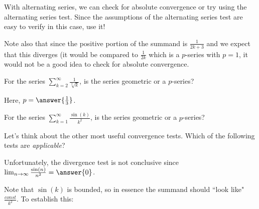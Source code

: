 \documentclass{ximera}
\begin{document}
\begin{exercise}
\begin{hint}
\begin{question}
With alternating series, we can check for absolute convergence or try using the alternating series test.  Since the assumptions of the alternating series test are easy to verify in this case, use it!

Note also that since the positive portion of the summand is $\frac{1}{2k+3}$ and we expect that this diverges (it would be compared to $\frac{1}{2k}$ which is a $p$-series with $p=1$, it would not be a good idea to check for absolute convergence.

\end{question}

\begin{question}
For the series $\sum_{k=2}^{\infty} \frac{1}{\sqrt[3]{k}}$, is the series geometric or a $p$-series?

\begin{multipleChoice}
\end{multipleChoice}

Here, $p= \answer{\frac{1}{3}}$. 
\end{question}

\begin{question}

For the series $\sum_{k=1}^{\infty} \frac{\sin(k)}{k^2}$, is the series geometric or a $p$-series?

\begin{multipleChoice}
\end{multipleChoice}

Let's think about the other most useful convergence tests.  Which of the following tests are \emph{applicable}?

\begin{selectAll}
\end{selectAll}

Unfortunately, the divergence test is not conclusive since $\lim_{n \to \infty} \frac{\sin(n)}{n^2} = \answer{0}$.  

Note that $\sin(k)$ is bounded, so in essence the summand should ``look like" $\frac{const}{k^2}$.  To establish this:


\end{question}
\end{hint}
\end{exercise}
\end{document}

